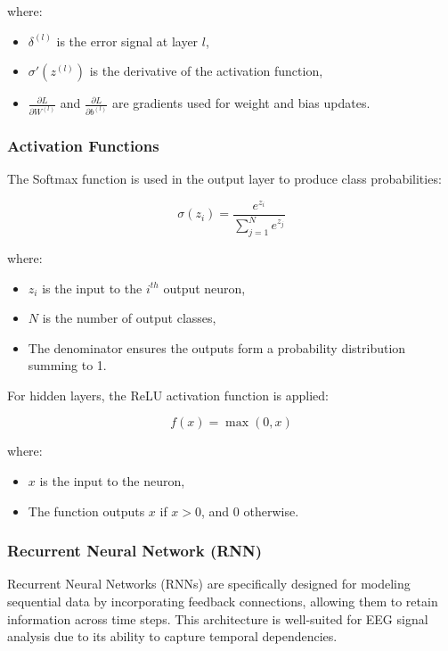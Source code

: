 \noindent where:
\begin{itemize}
	\item \( \delta^{(l)} \) is the error signal at layer \( l \),
	\item \( \sigma'(z^{(l)}) \) is the derivative of the activation function,
	\item \( \frac{\partial L}{\partial W^{(l)}} \) and \( \frac{\partial L}{\partial b^{(l)}} \) are gradients used for weight and bias updates.
\end{itemize}

\subsubsection{Activation Functions}

The Softmax function is used in the output layer to produce class probabilities:

\begin{equation}
	\sigma(z_i) = \frac{e^{z_i}}{\sum_{j=1}^{N} e^{z_j}}
\end{equation}

\noindent where:
\begin{itemize}
	\item \( z_i \) is the input to the \( i^{th} \) output neuron,
	\item \( N \) is the number of output classes,
	\item The denominator ensures the outputs form a probability distribution summing to 1.
\end{itemize}

For hidden layers, the ReLU activation function is applied:

\begin{equation}
	f(x) = \max(0, x)
\end{equation}

\noindent where:
\begin{itemize}
	\item \( x \) is the input to the neuron,
	\item The function outputs \( x \) if \( x > 0 \), and 0 otherwise.
\end{itemize}


\subsubsection{Recurrent Neural Network (RNN)}

Recurrent Neural Networks (RNNs) are specifically designed for modeling sequential data by incorporating feedback connections, allowing them to retain information across time steps. This architecture is well-suited for EEG signal analysis due to its ability to capture temporal dependencies.

